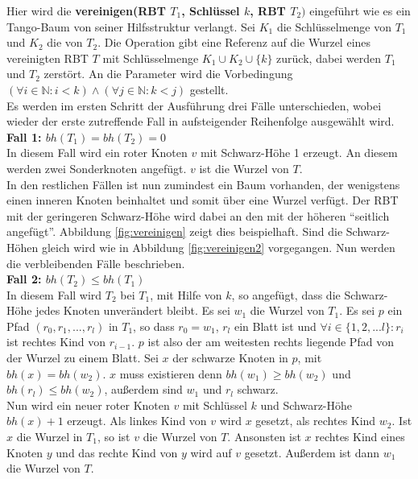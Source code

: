 \documentclass[a4paper,12pt]{article}
\begin{document}
\noindent Hier wird die \textbf{vereinigen(RBT $T_1$, Schlüssel $k$, RBT $T_2)$} eingeführt wie es ein Tango-Baum von seiner Hilfsstruktur verlangt. Sei $K_1$ die Schlüsselmenge von $T_1$ und $K_2$ die von $T_2$. Die Operation gibt eine Referenz auf die Wurzel eines vereinigten RBT $T$ mit Schlüsselmenge $K_1 \cup K_2 \cup \{k\} $ zurück, dabei werden $T_1$ und $T_2$ zerstört. An die Parameter wird die Vorbedingung $(\forall i \in \mathbb{N}: i < k ) \land (\forall j \in \mathbb{N}: k < j )$ gestellt.\\
 Es werden im ersten Schritt der Ausführung drei Fälle unterschieden, wobei wieder der erste zutreffende Fall in aufsteigender Reihenfolge ausgewählt wird. \\
\noindent\textbf{Fall 1: $bh(T_1) = bh(T_2) = 0$ }\\   
In diesem Fall wird ein roter Knoten $v$ mit Schwarz-Höhe 1 erzeugt. An diesem werden zwei Sonderknoten angefügt. $v$ ist die Wurzel von $T$. \\
In den restlichen Fällen ist nun zumindest ein Baum vorhanden, der wenigstens einen inneren Knoten beinhaltet und somit über eine Wurzel verfügt. Der RBT mit der geringeren Schwarz-Höhe wird dabei an den mit der höheren \enquote{seitlich angefügt}. Abbildung \ref{fig:vereinigen} zeigt dies beispielhaft. Sind die Schwarz-Höhen gleich wird wie in Abbildung \ref{fig:vereinigen2} vorgegangen. Nun werden die verbleibenden Fälle beschrieben.\\
\noindent\textbf{Fall 2: $bh(T_2) \leq bh(T_1)$ }\\
In diesem Fall wird $T_2$ bei $T_1$, mit Hilfe von $k$, so angefügt, dass die Schwarz-Höhe jedes Knoten unverändert bleibt. Es sei $w_1$ die Wurzel von $T_1$. Es sei $p$ ein Pfad $(r_0,r_1,...,r_l)$ in $T_1$, so dass $r_0 = w_1$, $r_l$ ein Blatt ist und $\forall i \in \{1,2,...l\} \colon r_i$  ist rechtes Kind von  $r_{i-1}$. $p$ ist also der am weitesten rechts liegende Pfad von der Wurzel zu einem Blatt. Sei $x$ der schwarze Knoten in $p$, mit $\mathit{bh}(x) = \mathit{bh}(w_2)$. $x$ muss existieren denn $\mathit{bh}(w_1) \geq \mathit{bh}(w_2)$ und $\mathit{bh}(r_l) \leq  \mathit{bh}(w_2)$, außerdem sind $w_1$ und $r_l$ schwarz.\\
 Nun wird ein neuer roter Knoten $v$ mit Schlüssel $k$ und Schwarz-Höhe $\mathit{bh}(x) + 1$ erzeugt. Als linkes Kind von $v$  wird $x$ gesetzt, als rechtes Kind $w_2$. Ist $x$ die Wurzel in $T_1$, so ist $v$ die Wurzel von $T$. Ansonsten ist $x$ rechtes Kind eines Knoten $y$ und das rechte Kind von $y$ wird auf $v$ gesetzt. Außerdem ist dann $w_1$ die Wurzel von $T$.     \\  
\end{document}
